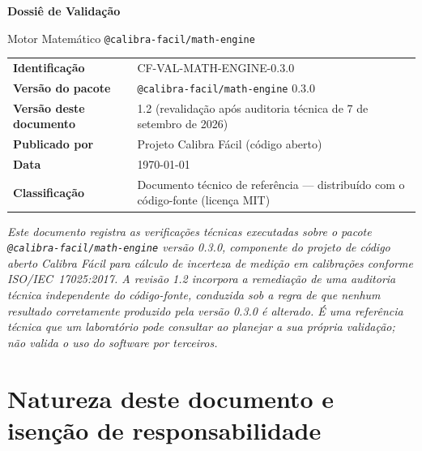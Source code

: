 \documentclass[11pt,a4paper]{article}
\makeatletter
\newcommand{\docTitle}{Dossiê de Validação}
\newcommand{\docSubject}{Motor Matemático \texttt{@calibra-facil/math-engine}}
\newcommand{\docVersion}{0.3.0}
\newcommand{\docRevision}{1.2}
\newcommand{\docId}{CF-VAL-MATH-ENGINE-0.3.0}
\newcommand{\docDate}{\today}
\newcommand{\organizationName}{Projeto Calibra Fácil}
\newcommand{\auditDate}{7 de setembro de 2026}
\makeatother
\begin{document}
\begin{titlepage}
  \begin{center}
    \vspace*{1.5cm}
    {\Huge\bfseries \docTitle\par}
    \vspace{0.4cm}
    {\Large \docSubject\par}
    \vspace{2.5cm}
    \begin{tabularx}{0.85\textwidth}{l X}
      \toprule
      \textbf{Identificação} & \docId \\
      \textbf{Versão do pacote} & \texttt{@calibra-facil/math-engine} \docVersion \\
      \textbf{Versão deste documento} & \docRevision{} (revalidação após auditoria técnica de \auditDate) \\
      \textbf{Publicado por} & \organizationName{} (código aberto) \\
      \textbf{Data} & \docDate \\
      \textbf{Classificação} & Documento técnico de referência --- distribuído com o código-fonte (licença MIT) \\
      \bottomrule
    \end{tabularx}
    \vfill
    \begin{minipage}{0.85\textwidth}
      \small\itshape
      Este documento registra as verificações técnicas executadas sobre o pacote \texttt{@calibra-facil/math-engine} versão \docVersion{}, componente do projeto de código aberto Calibra Fácil para cálculo de incerteza de medição em calibrações conforme \mbox{ISO/IEC 17025:2017}. A revisão \docRevision{} incorpora a remediação de uma auditoria técnica independente do código-fonte, conduzida sob a regra de que nenhum resultado corretamente produzido pela versão \docVersion{} é alterado. É uma referência técnica que um laboratório pode consultar ao planejar a sua própria validação; não valida o uso do software por terceiros.
    \end{minipage}
  \end{center}
\end{titlepage}

\section*{Natureza deste documento e isenção de responsabilidade}
\end{document}
